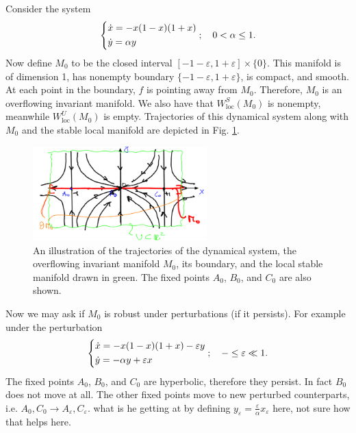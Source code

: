 \begin{ex}[]
	Consider the system
	\begin{align}
		\begin{dcases}
			\dot{x}= -x(1-x)(1+x) \\
			\dot{y} = \alpha y
		\end{dcases}
		;\quad 0 < \alpha \leq 1.
	\end{align}
	Now define $M_0$ to be the closed interval $[-1-\varepsilon, 1 + \varepsilon]\times \{0\}$. This manifold is of dimension 1, has nonempty boundary $\{-1-\varepsilon, 1+\varepsilon\}$, is compact, and smooth. At each point in the boundary, $f$ is pointing away from $M_0$. Therefore, $M_0$ is an overflowing invariant manifold. We also have that $W^{S}_{ \textrm{loc}}(M_0)$ is nonempty, meanwhile $W^{U}_{ \textrm{loc} }(M_0)$ is empty. Trajectories of this dynamical system along with $M_0$ and the stable local manifold are depicted in Fig. \ref{fig:overflowing_mfd_ex1}.
	\begin{figure}[h!]
		\centering
		\includegraphics[width=0.6\textwidth]{figures/ch9/11overflowing_mfd_ex1.png}
		\caption{An illustration of the trajectories of the dynamical system, the overflowing invariant manifold $M_0$, its boundary, and the local stable manifold drawn in green. The fixed points $A_0$, $B_0$, and $C_0$ are also shown.}
		\label{fig:overflowing_mfd_ex1}
	\end{figure}

	Now we may ask if $M_0$ is robust under perturbations (if it persists). For example under the perturbation
	\begin{align}
		\begin{dcases}
			\dot{x} = -x(1-x)(1+x) -\varepsilon y \\
			\dot{y} = - \alpha y + \varepsilon x
		\end{dcases}
		;\quad - \leq \varepsilon \ll 1.
	\end{align}
	The fixed points $A_0$, $B_0$, and $C_0$ are hyperbolic, therefore they persist. In fact $B_0$ does not move at all. The other fixed points move to new perturbed counterparts, i.e. $A_0,C_0 \to A_{\varepsilon}, C_{\varepsilon}$. 
	{\color{blue} what is he getting at by defining $y_{\varepsilon} = \frac{\varepsilon}{\alpha}x_{\varepsilon}$ here, not sure how that helps here.}


\end{ex}
